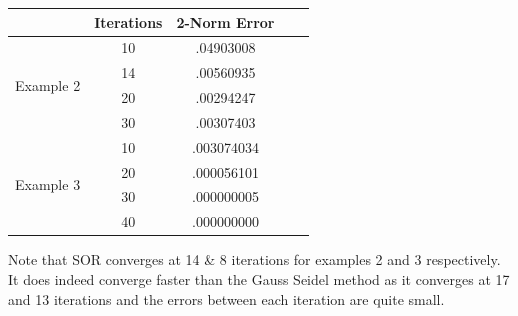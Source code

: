 \documentclass[11pt]{article}	%
\begin{document}
\begin{center}
	 \label{tab:title}
    \begin{tabular}{||c|c|c|c|c||}
        \hline
        & Iterations & 2-Norm Error \\ [.35em]
        \hline
        \multirow{4}{5em}{Example 2} & 10 & .04903008 \\ [.25em]
        & 14 & .00560935 \\ [.25em]
        & 20 & .00294247 \\ [.25em]
        & 30 & .00307403 \\ [.25em]
        \hline
        \multirow{4}{5em}{Example 3} & 10 & .003074034 \\ [.25em]
        & 20 & .000056101 \\ [.25em]
        & 30 & .000000005 \\ [.25em]
        & 40 & .000000000 \\ [.25em]
        \hline
    \end{tabular}
\end{center}

Note that SOR converges at 14 \& 8 iterations for examples 2 and 3 respectively. It does indeed converge faster than the Gauss Seidel method as it converges at 17 and 13 iterations and the errors between each iteration are quite small.
\end{document}
